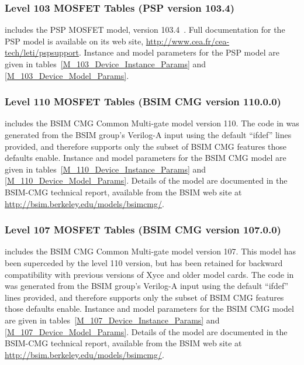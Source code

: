 


\subsubsection{Level 103 MOSFET Tables (PSP version 103.4)}
\Xyce{} includes the PSP MOSFET model, version 103.4~\cite{PSP:2006}.  Full
documentation for the PSP model is available on its web site,
\url{http://www.cea.fr/cea-tech/leti/pspsupport}.  Instance and model
parameters for the PSP model are given in
tables~\ref{M_103_Device_Instance_Params} and \ref{M_103_Device_Model_Params}.




\clearpage
\subsubsection{Level 110 MOSFET Tables (BSIM CMG version 110.0.0)}
\Xyce{} includes the BSIM CMG Common Multi-gate model version 110.
The code in \Xyce{} was generated from the BSIM group's Verilog-A
input using the default ``ifdef'' lines provided, and therefore
supports only the subset of BSIM CMG features those defaults enable.
Instance and model parameters for the BSIM CMG model are given in
tables~\ref{M_110_Device_Instance_Params} and
\ref{M_110_Device_Model_Params}.  Details of the model are documented
in the BSIM-CMG technical report\cite{BSIMCMG:Manual}, available from
the BSIM web site at
\url{http://bsim.berkeley.edu/models/bsimcmg/}.




\subsubsection{Level 107 MOSFET Tables (BSIM CMG version 107.0.0)}
\Xyce{} includes the BSIM CMG Common Multi-gate model version 107.
This model has been superceded by the level 110 version, but has been
retained for backward compatibility with previous versions of Xyce and
older model cards.  The code in \Xyce{} was generated from the BSIM
group's Verilog-A input using the default ``ifdef'' lines provided,
and therefore supports only the subset of BSIM CMG features those
defaults enable.  Instance and model parameters for the BSIM CMG model
are given in tables~\ref{M_107_Device_Instance_Params} and
\ref{M_107_Device_Model_Params}.  Details of the model are documented
in the BSIM-CMG technical report\cite{BSIMCMG:Manual}, available from
the BSIM web site at \url{http://bsim.berkeley.edu/models/bsimcmg/}.

